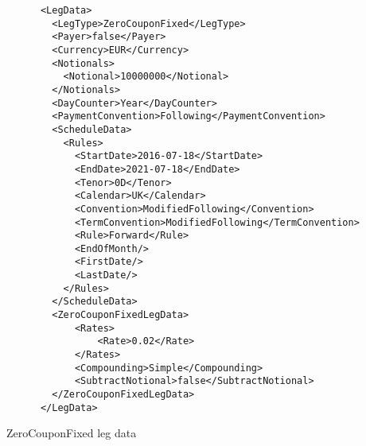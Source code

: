 \begin{listing}[H]
\begin{verbatim}
      <LegData>
        <LegType>ZeroCouponFixed</LegType>
        <Payer>false</Payer>
        <Currency>EUR</Currency>
        <Notionals>
          <Notional>10000000</Notional>
        </Notionals>
        <DayCounter>Year</DayCounter>
        <PaymentConvention>Following</PaymentConvention>
        <ScheduleData>
          <Rules>
            <StartDate>2016-07-18</StartDate>
            <EndDate>2021-07-18</EndDate>
            <Tenor>0D</Tenor>
            <Calendar>UK</Calendar>
            <Convention>ModifiedFollowing</Convention>
            <TermConvention>ModifiedFollowing</TermConvention>
            <Rule>Forward</Rule>
            <EndOfMonth/>
            <FirstDate/>
            <LastDate/>
          </Rules>
        </ScheduleData>
        <ZeroCouponFixedLegData>
            <Rates>
                <Rate>0.02</Rate>
            </Rates>
            <Compounding>Simple</Compounding>
            <SubtractNotional>false</SubtractNotional>
        </ZeroCouponFixedLegData>
      </LegData>
\end{verbatim}
\caption{ZeroCouponFixed leg data}
\label{lst:zerolegdata}
\end{listing}

